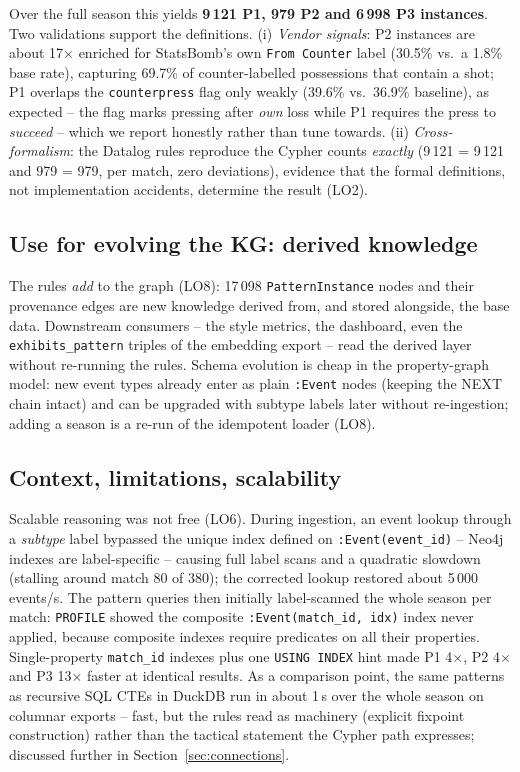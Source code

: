 \documentclass[11pt,a4paper]{article}
\begin{document}
Over the full season this yields \textbf{9\,121 P1, 979 P2 and 6\,998 P3
instances}. Two validations support the definitions. (i) \emph{Vendor signals}:
P2 instances are about 17$\times$ enriched for StatsBomb's own
\texttt{From Counter} label (30.5\% vs.\ a 1.8\% base rate), capturing 69.7\% of
counter-labelled possessions that contain a shot; P1 overlaps the
\texttt{counterpress} flag only weakly (39.6\% vs.\ 36.9\% baseline), as
expected -- the flag marks pressing after \emph{own} loss while P1 requires the
press to \emph{succeed} -- which we report honestly rather than tune towards.
(ii) \emph{Cross-formalism}: the Datalog rules reproduce the Cypher counts
\emph{exactly} (9\,121 = 9\,121 and 979 = 979, per match, zero deviations),
evidence that the formal definitions, not implementation accidents, determine
the result (LO2).

\subsection{Use for evolving the KG: derived knowledge}

The rules \emph{add} to the graph (LO8): 17\,098 \texttt{PatternInstance} nodes
and their provenance edges are new knowledge derived from, and stored alongside,
the base data. Downstream consumers -- the style metrics, the dashboard, even
the \texttt{exhibits\_pattern} triples of the embedding export -- read the
derived layer without re-running the rules. Schema evolution is cheap in the
property-graph model: new event types already enter as plain \texttt{:Event}
nodes (keeping the NEXT chain intact) and can be upgraded with subtype labels
later without re-ingestion; adding a season is a re-run of the idempotent loader
(LO8).

\subsection{Context, limitations, scalability}

Scalable reasoning was not free (LO6). During ingestion, an event lookup through
a \emph{subtype} label bypassed the unique index defined on
\texttt{:Event(event\_id)} -- Neo4j indexes are label-specific -- causing full
label scans and a quadratic slowdown (stalling around match 80 of 380); the
corrected lookup restored about 5\,000 events/s. The pattern queries then
initially label-scanned the whole season per match: \texttt{PROFILE} showed the
composite \texttt{:Event(match\_id, idx)} index never applied, because composite
indexes require predicates on all their properties. Single-property
\texttt{match\_id} indexes plus one \texttt{USING INDEX} hint made P1
4$\times$, P2 4$\times$ and P3 13$\times$ faster at identical results. As a
comparison point, the same patterns as recursive SQL CTEs in DuckDB run in about
1\,s over the whole season on columnar exports -- fast, but the rules read as
machinery (explicit fixpoint construction) rather than the tactical statement
the Cypher path expresses; discussed further in
Section~\ref{sec:connections}.
\end{document}
